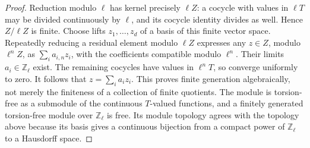 \begin{proof}
Reduction modulo \(\ell\) has kernel precisely \(\ell Z\): a
cocycle with values in \(\ell T\) may be divided continuously
by \(\ell\), and its cocycle identity divides as well. Hence
\(Z/\ell Z\) is finite. Choose lifts \(z_1,\ldots,z_d\) of a
basis of this finite vector space. Repeatedly reducing a residual
element modulo \(\ell Z\) expresses any \(z\in Z\), modulo
\(\ell^nZ\), as \(\sum_i a_{i,n}z_i\), with the coefficients
compatible modulo \(\ell^n\). Their limits \(a_i\in\mathbb Z_\ell\)
exist. The remaining cocycles have values in \(\ell^nT\), so
converge uniformly to zero. It follows that
\(z=\sum_i a_i z_i\). This proves finite generation algebraically,
not merely the finiteness of a collection of finite quotients.
The module is torsion-free as a submodule of the continuous
\(T\)-valued functions, and a finitely generated torsion-free
module over \(\mathbb Z_\ell\) is free. Its module topology
agrees with the topology above because its basis gives a continuous
bijection from a compact power of \(\mathbb Z_\ell\) to a
Hausdorff space.
\end{proof}

